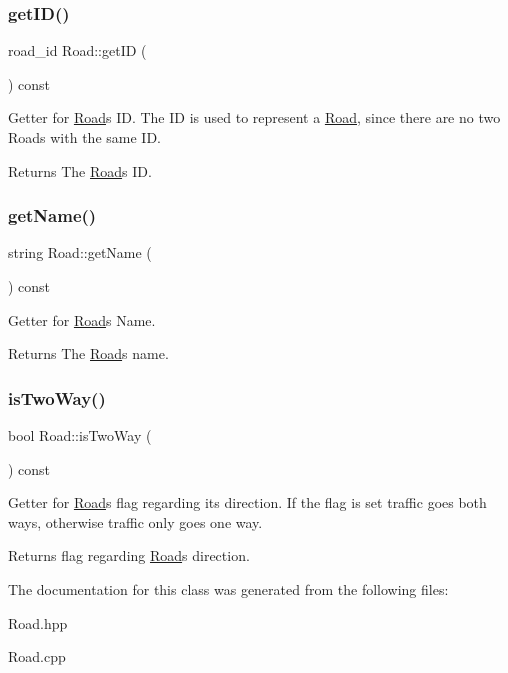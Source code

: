 \subsubsection{\texorpdfstring{get\+I\+D()}{getID()}}
{\footnotesize\ttfamily road\+\_\+id Road\+::get\+ID (\begin{DoxyParamCaption}{ }\end{DoxyParamCaption}) const}

Getter for \hyperlink{class_road}{Road}\textquotesingle{}s ID. The ID is used to represent a \hyperlink{class_road}{Road}, since there are no two Roads with the same ID.

\begin{DoxyReturn}{Returns}
The \hyperlink{class_road}{Road}\textquotesingle{}s ID. 
\end{DoxyReturn}
\hypertarget{class_road_ae7c959eda8a11bc859ab5de5e278b735}{}\label{class_road_ae7c959eda8a11bc859ab5de5e278b735} 
\subsubsection{\texorpdfstring{get\+Name()}{getName()}}
{\footnotesize\ttfamily string Road\+::get\+Name (\begin{DoxyParamCaption}{ }\end{DoxyParamCaption}) const}

Getter for \hyperlink{class_road}{Road}\textquotesingle{}s Name.

\begin{DoxyReturn}{Returns}
The \hyperlink{class_road}{Road}\textquotesingle{}s name. 
\end{DoxyReturn}
\hypertarget{class_road_a9c412810b3a630a759f199c60f7f1cc6}{}\label{class_road_a9c412810b3a630a759f199c60f7f1cc6} 
\subsubsection{\texorpdfstring{is\+Two\+Way()}{isTwoWay()}}
{\footnotesize\ttfamily bool Road\+::is\+Two\+Way (\begin{DoxyParamCaption}{ }\end{DoxyParamCaption}) const}

Getter for \hyperlink{class_road}{Road}\textquotesingle{}s flag regarding its direction. If the flag is set traffic goes both ways, otherwise traffic only goes one way.

\begin{DoxyReturn}{Returns}
flag regarding \hyperlink{class_road}{Road}\textquotesingle{}s direction. 
\end{DoxyReturn}


The documentation for this class was generated from the following files\+:\begin{DoxyCompactItemize}
\item 
Road.\+hpp\item 
Road.\+cpp\end{DoxyCompactItemize}
